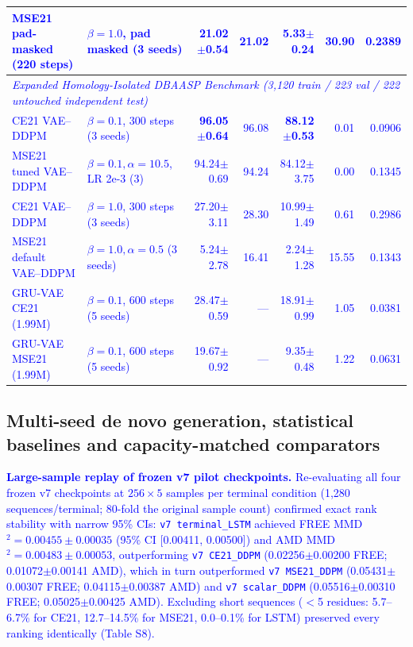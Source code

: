 \documentclass[unnumsec,webpdf,contemporary,large]{oup-authoring-template}
\newcommand{\rev}[1]{\textcolor{blue}{#1}}
\begin{document}
\begin{table}[t]
\begin{tabular}{llrrrrr}
\rev{MSE21 pad-masked (220 steps)} & \rev{$\beta=1.0$, pad masked (3 seeds)} & \rev{21.02$\pm$0.54} & \rev{21.02} & \rev{5.33$\pm$0.24} & \rev{30.90} & \rev{0.2389} \\
\midrule
\multicolumn{7}{l}{\textit{\rev{Expanded Homology-Isolated DBAASP Benchmark (3,120 train / 223 val / 222 untouched independent test)}}} \\
\rev{CE21 VAE--DDPM} & \rev{$\beta=0.1$, 300 steps (3 seeds)} & \rev{\textbf{96.05$\pm$0.64}} & \rev{96.08} & \rev{\textbf{88.12$\pm$0.53}} & \rev{0.01} & \rev{0.0906} \\
\rev{MSE21 tuned VAE--DDPM} & \rev{$\beta=0.1, \alpha=10.5$, LR 2e-3 (3)} & \rev{94.24$\pm$0.69} & \rev{94.24} & \rev{84.12$\pm$3.75} & \rev{0.00} & \rev{0.1345} \\
\rev{CE21 VAE--DDPM} & \rev{$\beta=1.0$, 300 steps (3 seeds)} & \rev{27.20$\pm$3.11} & \rev{28.30} & \rev{10.99$\pm$1.49} & \rev{0.61} & \rev{0.2986} \\
\rev{MSE21 default VAE--DDPM} & \rev{$\beta=1.0, \alpha=0.5$ (3 seeds)} & \rev{5.24$\pm$2.78} & \rev{16.41} & \rev{2.24$\pm$1.28} & \rev{15.55} & \rev{0.1343} \\
\rev{GRU-VAE CE21 (1.99M)} & \rev{$\beta=0.1$, 600 steps (5 seeds)} & \rev{28.47$\pm$0.59} & \rev{---} & \rev{18.91$\pm$0.99} & \rev{1.05} & \rev{0.0381} \\
\rev{GRU-VAE MSE21 (1.99M)} & \rev{$\beta=0.1$, 600 steps (5 seeds)} & \rev{19.67$\pm$0.92} & \rev{---} & \rev{9.35$\pm$0.48} & \rev{1.22} & \rev{0.0631} \\
\bottomrule
\end{tabular}
\end{table}

\subsection{Multi-seed de novo generation, statistical baselines and capacity-matched comparators}

\rev{\textbf{Large-sample replay of frozen v7 pilot checkpoints.} Re-evaluating all four frozen v7 checkpoints at $256\times 5$ samples per terminal condition (1,280 sequences/terminal; 80-fold the original sample count) confirmed exact rank stability with narrow 95\% CIs: \texttt{v7 terminal\_LSTM} achieved FREE MMD$^2=0.00455\pm 0.00035$ (95\% CI [0.00411, 0.00500]) and AMD MMD$^2=0.00483\pm 0.00053$, outperforming \texttt{v7 CE21\_DDPM} (0.02256$\pm$0.00200 FREE; 0.01072$\pm$0.00141 AMD), which in turn outperformed \texttt{v7 MSE21\_DDPM} (0.05431$\pm$0.00307 FREE; 0.04115$\pm$0.00387 AMD) and \texttt{v7 scalar\_DDPM} (0.05516$\pm$0.00310 FREE; 0.05025$\pm$0.00425 AMD). Excluding short sequences ($<$5 residues: 5.7--6.7\% for CE21, 12.7--14.5\% for MSE21, 0.0--0.1\% for LSTM) preserved every ranking identically (Table S8).}
\end{document}
